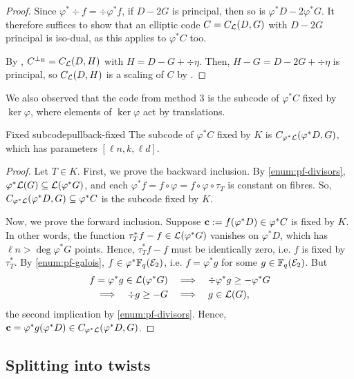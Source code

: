 \documentclass[twocolumn, 11pt]{scrartcl}
\begin{document}
\begin{proof}
    Since $\varphi^*\div f=\div\varphi^*f$, if $D-2G$ is principal, then so is $\varphi^*D-2\varphi^*G$. It therefore suffices to show that an elliptic code $C=C_\mathcal{L}(D,G)$ with $D-2G$ principal is iso-dual, as this applies to $\varphi^*C$ too.
    
    By , $C^{\perp_\mathrm{E}}=C_\mathcal{L}(D,H)$ with $H=D-G+\div\eta$. Then, $H-G=D-2G+\div\eta$ is principal, so $C_\mathcal{L}(D,H)$ is a scaling of $C$ by .
\end{proof}

We also observed that the code from method 3 is the subcode of $\varphi^*C$ fixed by $\ker\varphi$, where elements of $\ker\varphi$ act by translations.

\begin{proposition}{Fixed subcode}{pullback-fixed}
    The subcode of $\varphi^*C$ fixed by $K$ is $C_{\varphi^*\mathcal{L}}(\varphi^*D,G)$, which has parameters $[\ell n,k,\ell d]$.
\end{proposition}

\begin{proof}
Let $T\in K$. First, we prove the backward inclusion. By \ref{enum:pf-divisors}, $\varphi^*\mathcal{L}(G)\subseteq\mathcal{L}(\varphi^*G)$, and each $\varphi^*f=f\circ\varphi=f\circ\varphi\circ\tau_T$ is constant on fibres. So, $C_{\varphi^*\mathcal{L}}(\varphi^*D,G)\subseteq\varphi^*C$ is the subcode fixed by $K$.

Now, we prove the forward inclusion. Suppose $\mathbf{c}:=f(\varphi^*D)\in\varphi^*C$ is fixed by $K$. In other words, the function $\tau_T^*f-f\in\mathcal{L}(\varphi^*G)$ vanishes on $\varphi^*D$, which has $\ell n>\deg\varphi^*G$ points. Hence, $\tau_T^*f-f$ must be identically zero, i.e. $f$ is fixed by $\tau_T^*$. By \ref{enum:pf-galois}, $f\in\varphi^*\mathbb{F}_q(\mathcal{E}_2)$, i.e. $f=\varphi^*g$ for some $g\in\mathbb{F}_q(\mathcal{E}_2)$. But
\begin{align*}
    f=\varphi^*g\in\mathcal{L}(\varphi^*G) &\quad\Longrightarrow\quad \div\varphi^*g\geq-\varphi^*G \\
    \Longrightarrow\quad \div g\geq-G
    &\quad\Longrightarrow\quad g\in\mathcal{L}(G),
\end{align*}
the second implication by \ref{enum:pf-divisors}. Hence, $\mathbf{c}=\varphi^*g(\varphi^*D)\in C_{\varphi^*\mathcal{L}}(\varphi^*D,G)$.
\end{proof}

\subsection{Splitting into twists} \label{subsection:splitting}
\end{document}
